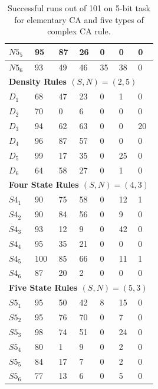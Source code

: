 \documentclass{elsarticle}
\begin{document}
\begin{multicols}{2}
\begin{table}[!htbp]
\begin{tabular}{|l|l|l|l|l|l|l|}
$N5_{5}$ & 95 & 87 & 26 & 0 & 0 & 0 \\ \hline
$N5_{6}$ & 93 & 49 & 46 & 35 & 38 & 0  \\ \hline
\multicolumn{7}{|l|}{\textbf{Density Rules \boldmath$(S,N) = (2,5)$}} \\ \hline
$D_{1}$ & 68 & 47 & 23 & 0 & 1 & 0  \\ \hline
$D_{2}$ & 70 & 0 & 6 & 0 & 0 & 0 \\ \hline
$D_{3}$ & 94 & 62 & 63 & 0 & 0 & 20 \\ \hline
$D_{4}$ & 96 & 87 & 57 & 0 & 0 & 0 \\ \hline
$D_{5}$ & 99 & 17 & 35 & 0 & 25 & 0 \\ \hline
$D_{6}$ & 64 & 58 & 27 & 0 & 1 & 0 \\ \hline
\multicolumn{7}{|l|}{\textbf{Four State Rules \boldmath$(S,N) = (4,3)$}} \\ 
\hline
$S4_{1}$ & 90 & 75 & 58 & 0 & 12  & 1 \\ \hline
$S4_{2}$ & 90 & 84 & 56 & 0 & 9 & 0  \\ \hline
$S4_{3}$ & 93 & 12 & 9 & 0 & 42 & 0 \\ \hline
$S4_{4}$ & 95 & 35 & 21 & 0 & 0 & 0 \\ \hline
$S4_{5}$ & 100 & 85 & 66 & 0 & 11 & 1 \\ \hline
$S4_{6}$ & 87 & 20 & 2 & 0 & 0 & 0 \\ \hline
\multicolumn{7}{|l|}{\textbf{Five State Rules \boldmath$(S,N) = (5,3)$}} \\ 
\hline
$S5_{1}$ & 95 & 50 & 42 & 8 & 15 & 0 \\ \hline
$S5_{2}$ & 95 & 76 & 70 & 0 & 7 & 0 \\ \hline
$S5_{3}$ & 98 & 74 & 51 & 0 & 24 & 0 \\ \hline
$S5_{4}$ & 80 & 1 & 9 & 0 & 2 & 0 \\ \hline
$S5_{5}$ & 84 & 17 & 7 & 0 & 2 & 0 \\ \hline
$S5_{6}$ & 77 & 13 & 6 & 0 & 5 & 0 \\ \hline
\end{tabular}
\caption{Successful runs out of 101 on 5-bit task for elementary CA and five 
    types of complex CA rule.}
\label{table:results}
\end{table}




\end{multicols}
\end{document}
